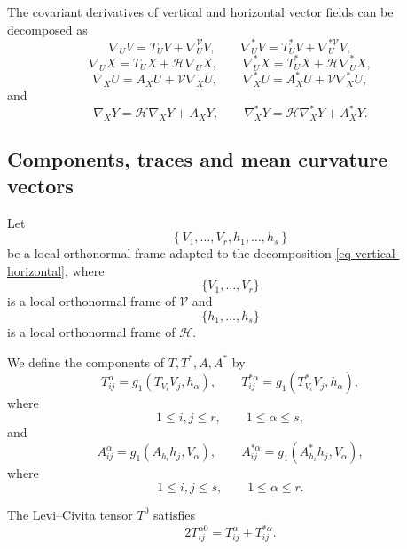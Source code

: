 \documentclass[10pt,a4paper]{article}
\theoremstyle{definition}
\theoremstyle{remark}
\numberwithin{equation}{section}
\begin{document}
The covariant derivatives of vertical and horizontal vector fields can be
decomposed as
\begin{equation}
\nabla_UV
=
T_UV+\nabla^{\mathcal V}_UV,
\qquad
\nabla^{*}_UV
=
T^{*}_UV+\nabla^{*\mathcal V}_UV,
\label{eq-decomp-1}
\end{equation}
\begin{equation}
\nabla_UX
=
T_UX+\mathcal H\nabla_UX,
\qquad
\nabla^{*}_UX
=
T^{*}_UX+\mathcal H\nabla^{*}_UX,
\label{eq-decomp-2}
\end{equation}
\begin{equation}
\nabla_XU
=
A_XU+\mathcal V\nabla_XU,
\qquad
\nabla^{*}_XU
=
A^{*}_XU+\mathcal V\nabla^{*}_XU,
\label{eq-decomp-3}
\end{equation}
and
\begin{equation}
\nabla_XY
=
\mathcal H\nabla_XY+A_XY,
\qquad
\nabla^{*}_XY
=
\mathcal H\nabla^{*}_XY+A^{*}_XY.
\label{eq-decomp-4}
\end{equation}

\subsection{Components, traces and mean curvature vectors}

Let
\[
\left\{
V_1,\ldots,V_r,h_1,\ldots,h_s
\right\}
\]
be a local orthonormal frame adapted to the decomposition
\eqref{eq-vertical-horizontal}, where
\[
\{V_1,\ldots,V_r\}
\]
is a local orthonormal frame of $\mathcal V$ and
\[
\{h_1,\ldots,h_s\}
\]
is a local orthonormal frame of $\mathcal H$.

We define the components of $T,T^{*},A,A^{*}$ by
\begin{equation}
T_{ij}^{\alpha}
=
g_1(T_{V_i}V_j,h_\alpha),
\qquad
T_{ij}^{*\alpha}
=
g_1(T^{*}_{V_i}V_j,h_\alpha),
\label{eq-T-components}
\end{equation}
where
\[
1\leq i,j\leq r,
\qquad
1\leq\alpha\leq s,
\]
and
\begin{equation}
A_{ij}^{\alpha}
=
g_1(A_{h_i}h_j,V_\alpha),
\qquad
A_{ij}^{*\alpha}
=
g_1(A^{*}_{h_i}h_j,V_\alpha),
\label{eq-A-components}
\end{equation}
where
\[
1\leq i,j\leq s,
\qquad
1\leq\alpha\leq r.
\]

The Levi--Civita tensor $T^{0}$ satisfies
\begin{equation}
2T^{\alpha 0}_{ij}
=
T_{ij}^{\alpha}+T_{ij}^{*\alpha}.
\label{eq-T0-components}
\end{equation}
\end{document}
